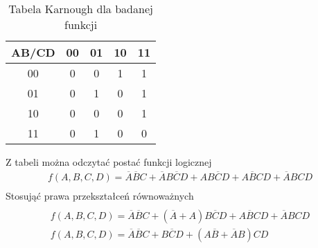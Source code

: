 \documentclass[12pt,a4paper,openright]{mwrep}
\begin{document}
\begin{table}[h!]
    \centering
    \begin{tabular}{|c|cccc|}
        \hline
        AB/CD & 00 & 01 & 10 & 11 \\
        \hline
        00 & 0 & 0 & 1 & 1 \\
        01 & 0 & 1 & 0 & 1 \\
        10 & 0 & 0 & 0 & 1 \\
        11 & 0 & 1 & 0 & 0 \\
        \hline
    \end{tabular}
    \caption{Tabela Karnough dla badanej funkcji}
\end{table}
Z tabeli można odczytać postać funkcji logicznej
\begin{align*}
    f(A,B,C,D) = \overline{A} \overline{B} C + \overline{A}B\overline{C}D 
    + AB\overline{C}D + A\overline{B}CD + \overline{A}BCD   \\ 
\end{align*}
Stosująć prawa przekształceń równoważnych
\begin{multline}
    \\f(A,B,C,D) = \overline{A} \overline{B} C + (\overline{A}  
    + A)B\overline{C}D + A\overline{B}CD + \overline{A}BCD   \\ 
    f(A,B,C,D) = \overline{A} \overline{B} C 
    + B\overline{C}D + (A\overline{B} + \overline{A}B)CD\\
\end{multline}
\end{document}
